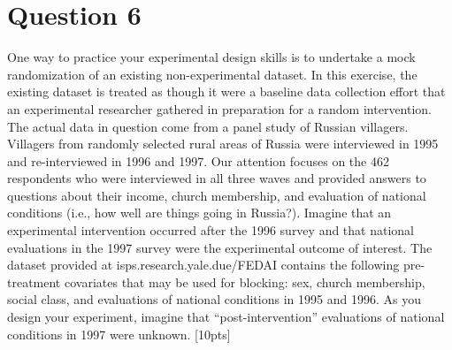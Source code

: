 \documentclass[11pt,notitlepage]{article}\usepackage[]{graphicx}\usepackage[]{color}
\begin{document}
\section*{Question 6}

One way to practice your experimental design skills is to undertake a mock randomization of an existing non-experimental dataset. In this exercise, the existing dataset is treated as though it were a baseline data collection effort that an experimental researcher gathered in preparation for a random intervention. The actual data in question come from a panel study of Russian villagers. Villagers from randomly selected rural areas of Russia were interviewed in 1995 and re-interviewed in 1996 and 1997.  Our attention focuses on the 462 respondents who were interviewed in all three waves and provided answers to questions about their income, church membership, and evaluation of national conditions (i.e., how well are things going in Russia?). Imagine that an experimental intervention occurred after the 1996 survey and that national evaluations in the 1997 survey were the experimental outcome of interest.  The dataset provided at isps.research.yale.due/FEDAI contains the following pre-treatment covariates that may be used for blocking: sex, church membership, social class, and evaluations of national conditions in 1995 and 1996. As you design your experiment, imagine that ``post-intervention'' evaluations of national conditions in 1997 were unknown. [10pts]
\end{document}
